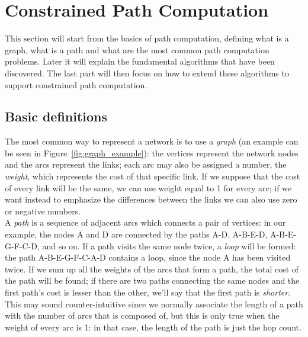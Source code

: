 \documentclass[10pt,a4paper]{report}
\begin{document}
\section{Constrained Path Computation}

This section will start from the basics of path computation, defining
what is a graph, what is a path and what are the most common path
computation problems. Later it will explain the fundamental algorithms
that have been discovered. The last part will then focus on how to
extend these algorithms to support constrained path computation.

\subsection{Basic definitions}

The most common way to represent a network is to use a \textit{graph}
(an example can be seen in Figure~\ref{fig:graph_example}): the
vertices represent the network nodes and the arcs represent the links;
each arc may also be assigned a number, the \textit{weight}, which
represents the cost of that specific link. If we suppose that the cost
of every link will be the same, we can use weight equal to 1 for every
arc; if we want instead to emphasize the differences between the links
we can also use zero or negative numbers. \\
A \textit{path} is a sequence of adjacent arcs which connects a pair
of vertices: in our example, the nodes A and D are connected by the
paths A-D, A-B-E-D, A-B-E-G-F-C-D, and so on. If a path visits the
same node twice, a \textit{loop} will be formed: the path
A-B-E-G-F-C-A-D contains a loop, since the node A has been visited
twice. If we sum up all the weights of the arcs that form a path, the
total cost of the path will be found; if there are two paths
connecting the same nodes and the first path's cost is lesser than the
other, we'll say that the first path is \textit{shorter}. This may
sound counter-intuitive since we normally associate the length of a
path with the number of arcs that is composed of, but this is only true
when the weight of every arc is 1: in that case, the length of the
path is just the hop count.
\end{document}
